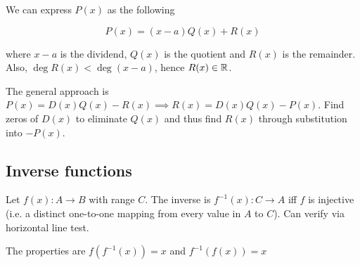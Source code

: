 We can express $P(x)$ as the following

\begin{equation}
    P(x)=(x-a)Q(x)+R(x)
\end{equation}

where $x-a$ is the dividend, $Q(x)$ is the quotient and $R(x)$ is the remainder.
Also, $\operatorname{deg} R(x)<\operatorname{deg}(x-a)$, hence $R(x)\in \mathbb{R}$.

The general approach is $P(x)=D(x)Q(x)-R(x)\implies R(x)=D(x)Q(x)-P(x)$.
Find zeros of $D(x)$ to eliminate $Q(x)$ and thus find $R(x)$ through substitution into $-P(x)$.

\subsection{Inverse functions}

\begin{definition}
    Let $f(x):A\to B$ with range $C$. The inverse is $f^{-1}(x):C\to A$ iff $f$ is injective (i.e. a distinct one-to-one mapping from every value in $A$ to $C$).
    Can verify via horizontal line test.
\end{definition}

The properties are $f(f^{-1}(x))=x$ and $f^{-1}(f(x))=x$